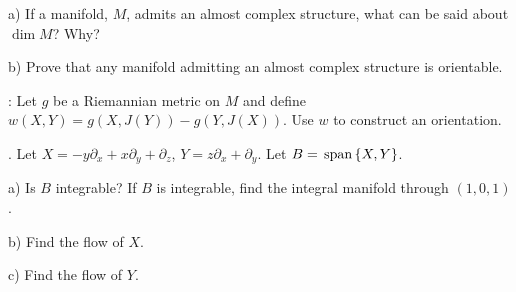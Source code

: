 \documentclass[12pt]{article}
\def\span{{\hbox{\,span\,}}}
\begin{document}
\begin{large}
\begin{description}
\item\quad a)
If a manifold, $M$, admits an almost complex structure,
what can be said about $\dim M$? Why?

\item\quad b)
Prove that any manifold admitting an almost complex structure is
orientable.

: Let $g$ be a Riemannian metric on $M$ and define $w(X,Y)=g(X,J(Y))-g(Y,J(X))$. Use $w$ to construct an orientation.

\item{}.
Let $X=-y\partial_x+x\partial_y+\partial_z$,
$Y=z\partial_x+\partial_y$.
Let $B=\span \{X,Y\}$.

\item\quad a)
Is $B$ integrable? If $B$ is integrable, find the integral manifold through
$(1,0,1)$.

\item\quad b)
Find the flow of $X$.

\item\quad c)
Find the flow of $Y$.


\end{description}
\end{large}
\end{document}
